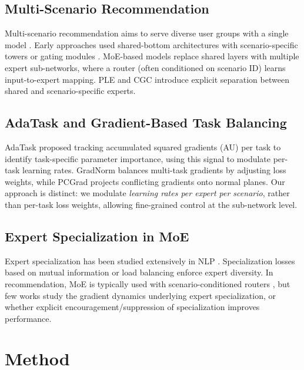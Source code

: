 \documentclass{article}
\begin{document}
\subsection{Multi-Scenario Recommendation}
Multi-scenario recommendation aims to serve diverse user groups with a single model \cite{sheng2021one}.
Early approaches used shared-bottom architectures with scenario-specific towers or gating modules \cite{tang2022pepnet, yan2022hybrid}.
MoE-based models \cite{ma2018modeling, zhu2021adapting} replace shared layers with multiple expert sub-networks, where a router (often conditioned on scenario ID) learns input-to-expert mapping.
PLE \cite{tang2020progressive} and CGC \cite{sun2023multiscenario} introduce explicit separation between shared and scenario-specific experts.

\subsection{AdaTask and Gradient-Based Task Balancing}
AdaTask \cite{yang2023adatask} proposed tracking accumulated squared gradients (AU) per task to identify task-specific parameter importance, using this signal to modulate per-task learning rates.
GradNorm \cite{chen2018gradnorm} balances multi-task gradients by adjusting loss weights, while PCGrad \cite{yu2020gradient} projects conflicting gradients onto normal planes.
Our approach is distinct: we modulate \emph{learning rates per expert per scenario}, rather than per-task loss weights, allowing fine-grained control at the sub-network level.

\subsection{Expert Specialization in MoE}
Expert specialization has been studied extensively in NLP \cite{fedus2022switch, lepikhin2020gshard, zhou2022mixture}.
Specialization losses based on mutual information \cite{gross2024hard} or load balancing \cite{shazeer2017outrageously} enforce expert diversity.
In recommendation, MoE is typically used with scenario-conditioned routers \cite{ma2018modeling}, but few works study the gradient dynamics underlying expert specialization, or whether explicit encouragement/suppression of specialization improves performance.

\section{Method}
\label{sec:method}
\end{document}
